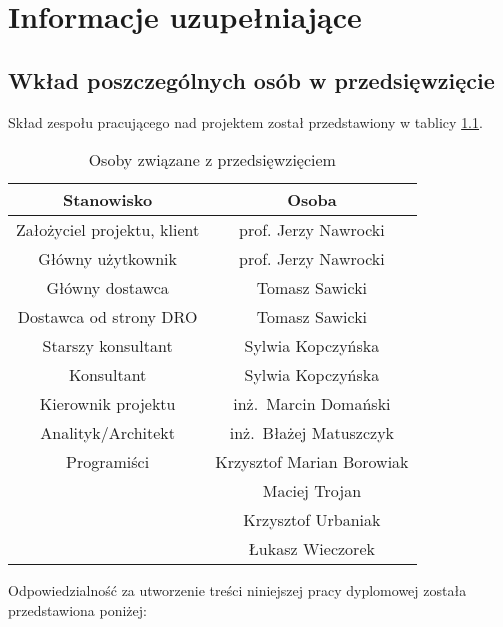 \chapter{Informacje uzupełniające}
\label{Chapter10}

\section{Wkład poszczególnych osób w przedsięwzięcie}
\label{Chapter101}

Skład zespołu pracującego nad projektem został przedstawiony w tablicy \ref{tab:roster}.

\begin{table}[H]
\centering
\begin{tabular}{ | c | c | }
\hline
\textbf{Stanowisko} & \textbf{Osoba} \\ \hline
Założyciel projektu, klient & prof. Jerzy Nawrocki \\ \hline
Główny użytkownik & prof. Jerzy Nawrocki \\ \hline
Główny dostawca & Tomasz Sawicki \\ \hline
Dostawca od strony DRO & Tomasz Sawicki \\ \hline
Starszy konsultant & Sylwia Kopczyńska \\ \hline
Konsultant & Sylwia Kopczyńska \\ \hline
Kierownik projektu & inż.~Marcin Domański \\ \hline
Analityk/Architekt & inż.~Błażej Matuszczyk \\ \hline
Programiści & Krzysztof Marian Borowiak \\ 
 & Maciej Trojan \\ 
 & Krzysztof Urbaniak \\ 
 & Łukasz Wieczorek \\
\hline
\end{tabular}
\caption{Osoby związane z przedsięwzięciem}\label{tab:roster}
\end{table}

\noindent
Odpowiedzialność za utworzenie treści niniejszej pracy dyplomowej została przedstawiona poniżej:

